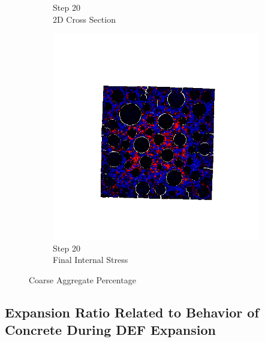 \begin{figure}[ht!]
\begin{subfigure}{.25\textwidth}
      \caption{Step 20\\2D Cross Section}
    \end{subfigure}%
    \begin{subfigure}{.25\textwidth}
      \centering
      \includegraphics[width=.8\linewidth]{Files/exp_3D/DEF/A30X0C_3_stress.png}
      \caption{Step 20\\Final Internal Stress}
    \end{subfigure}

\caption{Coarse Aggregate Percentage}
\label{fig:DEFA30_3}
\end{figure}


\subsection{Expansion Ratio Related to Behavior of Concrete During DEF Expansion}

